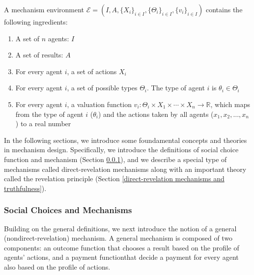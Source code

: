 \documentclass[11pt]{phdthesis}
\begin{document}
\begin{definition}
	A mechanism environment \sloppy $ \mathcal{E} = (I, A, \{X_i\}_{i \in I}, \{\Theta_{i}\}_{i \in I}, \{v_i\}_{i \in I}) $ contains the following ingredients:
	\begin{enumerate}
		\item A set of $n$ agents: $I$
		\item A set of results: $ A $
		\item For every agent $i$, a set of actions $X_i$
		\item For every agent $i$, a set of possible types $\Theta_i$. The type of agent $i$ is $\theta_i \in \Theta_i$
		\item For every agent $i$, a valuation function $v_i:\Theta_i \times X_1 \times \cdots \times X_n \rightarrow \mathbb{R}$, which maps from the type of agent $i$ ($ \theta_i $) and the actions taken by all agents ($ x_1,x_2,\ldots, x_n $) to a real number~\citep[Definition 9.40]{nisan2007algorithmic}
	\end{enumerate}
\end{definition}

In the following sections, we introduce some foundamental concepts and theories in mechanism design. Specifically, we introduce the definitions of social choice function and mechanism (Section \ref{social choices and mechanisms}), and we describe a special type of mechanisms called direct-revelation mechanisms along with an important theory called the revelation principle (Section \ref{direct-revelation mechanisms and truthfulness}).
\subsubsection{Social Choices and Mechanisms} \label{social choices and mechanisms}

Building on the general definitions, we next introduce the notion of a general (nondirect-revelation) mechanism. A general mechanism is composed of two components: an outcome function that chooses a result based on the profile of agents' actions, and a payment functionthat decide a payment for every agent also based on the profile of actions.
\end{document}
